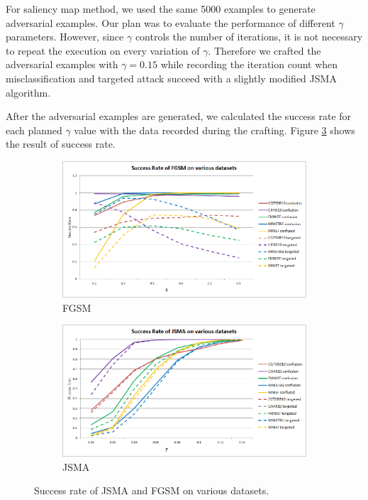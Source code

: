 \documentclass{article}
\begin{document}
For saliency map method, we used the same 5000 examples to generate adversarial examples.
Our plan was to evaluate the performance of different \(\gamma\) parameters.
However, since \(\gamma\) controls the number of iterations, it is not necessary to repeat the execution
on every variation of \(\gamma\).
Therefore we crafted the adversarial examples with \(\gamma=0.15\) while 
recording the iteration count when misclassification and targeted attack succeed with a slightly modified JSMA algorithm.

After the adversarial examples are generated, we calculated the success rate for each planned \(\gamma\) value
with the data recorded during the crafting. Figure \ref{fig:jsma} shows the result of success rate.

\begin{figure}[t!]
    \centering
    \begin{subfigure}[b]{0.49\linewidth}
        \includegraphics[width=\linewidth]{fgsm}
        \caption{FGSM}
        \label{fig:fgsm}
    \end{subfigure}
    \begin{subfigure}[b]{0.49\linewidth}
        \includegraphics[width=\linewidth]{jsma}
        \caption{JSMA}
        \label{fig:jsma}
    \end{subfigure}
    \caption{Success rate of JSMA and FGSM on various datasets.}
\end{figure}
\end{document}
